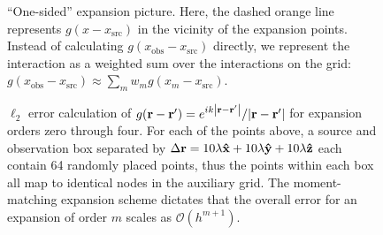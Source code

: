 \begin{figure}
  \centering
  
  \caption{\label{fig:1d moments} ``One-sided'' expansion picture.
    Here, the dashed orange line represents $g(x - x_\text{src})$ in the vicinity of the expansion points.
    Instead of calculating $g(x_\text{obs} - x_\text{src})$ directly, we represent the interaction as a weighted sum over the interactions on the grid: $g(x_\text{obs} - x_\text{src}) \approx \sum_m w_m g(x_m - x_\text{src})$.
  }
\end{figure}


\begin{figure}
  \centering
  
  \caption{\label{fig:grid convergence} $\ell_2$ error calculation of $g(\vb{r} - \vb{r}') = e^{i k \abs{\vb{r} - \vb{r}'}}/{\abs{\vb{r} - \vb{r}'}}$ for expansion orders zero through four.
    For each of the points above, a source and observation box separated by $\Delta \vb{r} = 10\lambda \vu{x} + 10 \lambda \vu{y} + 10 \lambda \vu{z}$ each contain 64 randomly placed points, thus the points within each box all map to identical nodes in the auxiliary grid. 
    The moment-matching expansion scheme dictates that the overall error for an expansion of order $m$ scales as $\mathcal{O}(h^{m + 1})$.
  }
\end{figure}
